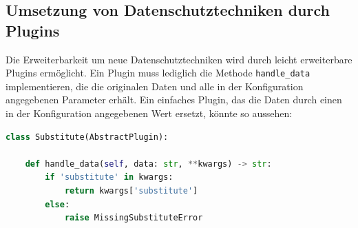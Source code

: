\subsection{Umsetzung von Datenschutztechniken durch Plugins}
\label{sec_integration_in_ossim_plugins}

Die Erweiterbarkeit um neue Datenschutztechniken wird durch leicht erweiterbare Plugins ermöglicht. Ein Plugin muss lediglich die Methode \texttt{handle\_data} implementieren, die die originalen Daten und alle in der Konfiguration angegebenen Parameter erhält. Ein einfaches Plugin, das die Daten durch einen in der Konfiguration angegebenen Wert ersetzt, könnte so aussehen:

\begin{lstlisting}[language=Python]
class Substitute(AbstractPlugin):

    def handle_data(self, data: str, **kwargs) -> str:
        if 'substitute' in kwargs:
            return kwargs['substitute']
        else:
            raise MissingSubstituteError
\end{lstlisting}